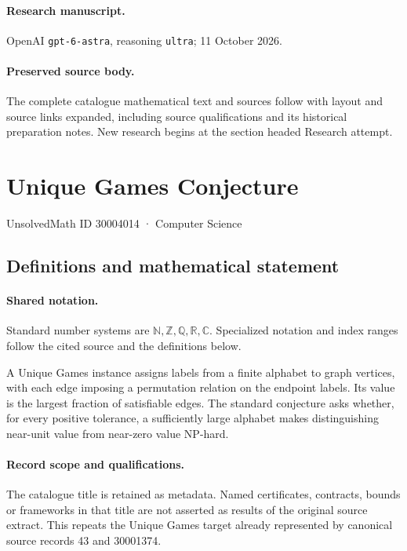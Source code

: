 \documentclass[11pt]{article}
\begin{document}
\paragraph{Research manuscript.} OpenAI \texttt{gpt-6-astra}, reasoning \texttt{ultra}; 11 October 2026.
\paragraph{Preserved source body.} The complete catalogue mathematical text and sources follow with layout and source links expanded, including source qualifications and its historical preparation notes. New research begins at the section headed Research attempt.

\section{Unique Games Conjecture}\label{30004014}
{\small UnsolvedMath ID 30004014 · Computer Science}
\subsection{Definitions and mathematical statement}

\paragraph{Shared notation.}Standard number systems are $\mathbb N,\mathbb Z,\mathbb Q,\mathbb R,\mathbb C$. Specialized notation and index ranges follow the cited source and the definitions below.


A Unique Games instance assigns labels from a finite alphabet to graph vertices, with each edge imposing a permutation relation on the endpoint labels. Its value is the largest fraction of satisfiable edges. The standard conjecture asks whether, for every positive tolerance, a sufficiently large alphabet makes distinguishing near-unit value from near-zero value NP-hard.
\paragraph{Record scope and qualifications.}
The catalogue title is retained as metadata. Named certificates, contracts, bounds or frameworks in that title are not asserted as results of the original source extract.
This repeats the Unique Games target already represented by canonical source records 43 and 30001374.
\end{document}
